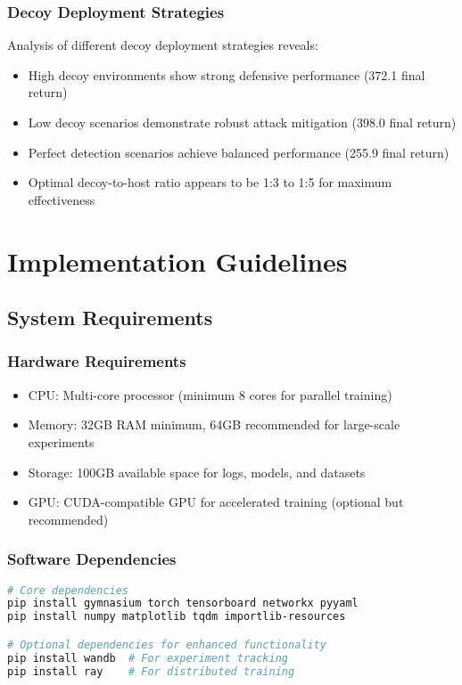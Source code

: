 \documentclass[12pt,a4paper]{article}
\begin{document}
\subsubsection{Decoy Deployment Strategies}
Analysis of different decoy deployment strategies reveals:

\begin{itemize}
    \item High decoy environments show strong defensive performance (372.1 final return)
    \item Low decoy scenarios demonstrate robust attack mitigation (398.0 final return)
    \item Perfect detection scenarios achieve balanced performance (255.9 final return)
    \item Optimal decoy-to-host ratio appears to be 1:3 to 1:5 for maximum effectiveness
\end{itemize}

\section{Implementation Guidelines}

\subsection{System Requirements}

\subsubsection{Hardware Requirements}
\begin{itemize}
    \item CPU: Multi-core processor (minimum 8 cores for parallel training)
    \item Memory: 32GB RAM minimum, 64GB recommended for large-scale experiments
    \item Storage: 100GB available space for logs, models, and datasets
    \item GPU: CUDA-compatible GPU for accelerated training (optional but recommended)
\end{itemize}

\subsubsection{Software Dependencies}
\begin{lstlisting}[language=bash, caption=Installation Commands]
# Core dependencies
pip install gymnasium torch tensorboard networkx pyyaml
pip install numpy matplotlib tqdm importlib-resources

# Optional dependencies for enhanced functionality
pip install wandb  # For experiment tracking
pip install ray    # For distributed training
\end{lstlisting}
\end{document}
